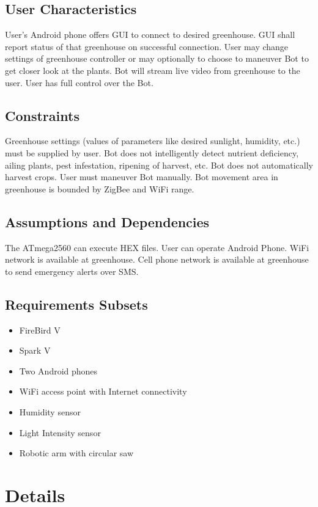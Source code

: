 \documentclass[a4paper, 12pt]{article}
\begin{document}
\subsection{User Characteristics}
User's Android phone offers GUI to connect to desired greenhouse. GUI shall report status of that greenhouse on
successful connection. User may change settings of greenhouse controller or may optionally to choose to maneuver 
Bot to get closer look at the plants. Bot will stream live video from greenhouse to the user.
User has full control over the Bot.

\subsection{Constraints}
Greenhouse settings (values of parameters like desired sunlight, humidity, etc.) must be supplied by user.
Bot does not intelligently detect nutrient deficiency, ailing plants, pest infestation, ripening of harvest, etc.
Bot does not automatically harvest crops. User must maneuver Bot manually.
Bot movement area in greenhouse is bounded by ZigBee and WiFi range.

\subsection{Assumptions and Dependencies}
The ATmega2560 can execute HEX files. User can operate Android Phone. WiFi network is available at greenhouse.
Cell phone network is available at greenhouse to send emergency alerts over SMS. 

\subsection{Requirements Subsets}
\begin{itemize}
 \item FireBird V
 \item Spark V 
 \item Two Android phones
 \item WiFi access point with Internet connectivity
 \item Humidity sensor
 \item Light Intensity sensor
 \item Robotic arm with circular saw
\end{itemize}

\section{Details}
\end{document}
